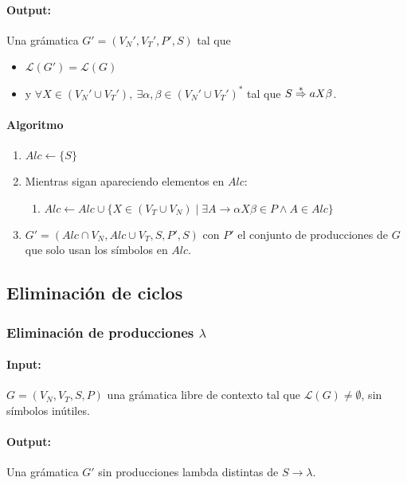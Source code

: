 \paragraph{Output:} Una grámatica \(G'=(V_N',V_T', P', S)\) tal que
\begin{itemize}
  \item \(\mathcal{L}(G') = \mathcal{L}(G)\)
  \item y \(\forall X\in(V_N'\cup V_T'),~\exists\alpha,\beta\in(V_N'\cup V_T')^*\) tal que \(S\overset{*}{\Rightarrow} aX\beta\).
\end{itemize}

\paragraph{Algoritmo}
\begin{enumerate}
  \item \(Alc\leftarrow\{S\}\)
  \item Mientras sigan apareciendo elementos en \(Alc\):
        \begin{enumerate}
          \item[] \(Alc\leftarrow Alc\cup\{X\in (V_T\cup V_N)\mid \exists A\to \alpha X\beta\in P \land A\in Alc\}\)
        \end{enumerate}
  \item \(G' = (Alc\cap V_N, Alc\cup V_T , S, P', S)\) con \(P'\) el conjunto de producciones de \(G\) que solo usan los símbolos en \(Alc\).
\end{enumerate}

\subsection{Eliminación de ciclos}
\subsubsection{Eliminación de producciones \(\lambda\)}

\paragraph{Input:} \(G = (V_N, V_T, S, P)\) una grámatica libre de contexto tal que \(\mathcal{L}(G)\neq\emptyset\), sin símbolos inútiles.

\paragraph{Output:} Una grámatica \(G'\) sin producciones lambda distintas de \(S\to \lambda\).

